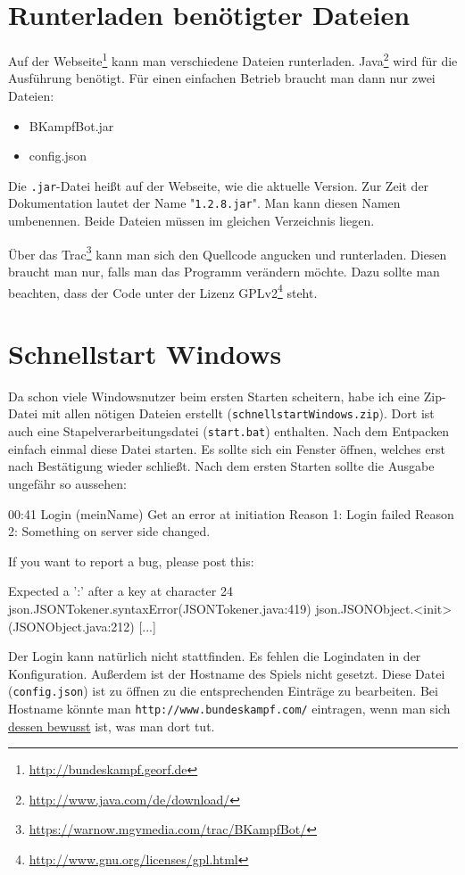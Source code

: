 \documentclass{scrartcl}
\newcommand{\Botversion}{1.2.8}
\begin{document}
\section{Runterladen benötigter Dateien}
Auf der Webseite\footnote{\url{http://bundeskampf.georf.de}} kann man verschiedene Dateien runterladen. Java\footnote{\url{http://www.java.com/de/download/}} wird für die Ausführung benötigt. Für einen einfachen Betrieb braucht man dann nur zwei Dateien:
\begin{itemize}
  \item BKampfBot.jar
  \item config.json
\end{itemize}

Die \texttt{.jar}-Datei heißt auf der Webseite, wie die aktuelle Version. Zur Zeit der Dokumentation lautet der Name "\texttt{\Botversion.jar}". Man kann diesen Namen umbenennen. Beide Dateien müssen im gleichen Verzeichnis liegen.

Über das Trac\footnote{\url{https://warnow.mgvmedia.com/trac/BKampfBot/}} kann man sich den Quellcode angucken und runterladen. Diesen braucht man nur, falls man das Programm verändern möchte. Dazu sollte man beachten, dass der Code unter der Lizenz GPLv2\footnote{\url{http://www.gnu.org/licenses/gpl.html}} steht.


\section{Schnellstart Windows}
Da schon viele Windowsnutzer beim ersten Starten scheitern, habe ich eine Zip-Datei mit allen nötigen Dateien erstellt (\texttt{schnellstartWindows.zip}). Dort ist auch eine Stapelverarbeitungsdatei (\texttt{start.bat}) enthalten. Nach dem Entpacken einfach einmal diese Datei starten. Es sollte sich ein Fenster öffnen, welches erst nach Bestätigung wieder schließt. Nach dem ersten Starten sollte die Ausgabe ungefähr so aussehen:
 
\begin{code}[basicstyle=\tiny\ttfamily]
00:41 Login (meinName)
Get an error at initiation
Reason 1: Login failed
Reason 2: Something on server side changed.

If you want to report a bug, please post this:

Expected a ':' after a key at character 24
json.JSONTokener.syntaxError(JSONTokener.java:419)
json.JSONObject.<init>(JSONObject.java:212)
[...]
\end{code}

Der Login kann natürlich nicht stattfinden. Es fehlen die Logindaten in der Konfiguration. Außerdem ist der Hostname des Spiels nicht gesetzt. Diese Datei (\texttt{config.json}) ist zu öffnen zu die entsprechenden Einträge zu bearbeiten. Bei Hostname könnte man \texttt{http://www.bundeskampf.com/} eintragen, wenn man sich \hyperref[verboten]{dessen bewusst} ist, was man dort tut. 
\end{document}
